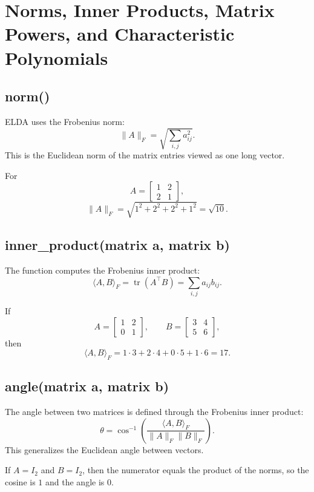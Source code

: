 \documentclass[11pt,a4paper,openany]{book}
\def\code#1{#1}%
\DeclareRobustCommand{\code}[1]{\texttt{\detokenize{#1}}}
\DeclareMathOperator{\tr}{tr}
\begin{document}
\chapter{Norms, Inner Products, Matrix Powers, and Characteristic Polynomials}

\section{\code{norm()}}
ELDA uses the Frobenius norm:
\[
\|A\|_F = \sqrt{\sum_{i,j} a_{ij}^2}.
\]
This is the Euclidean norm of the matrix entries viewed as one long vector.

\begin{examplebox}[Example]
For
\[
A =
\begin{bmatrix}
1 & 2 \\
2 & 1
\end{bmatrix},
\]
\[
\|A\|_F = \sqrt{1^2 + 2^2 + 2^2 + 1^2} = \sqrt{10}.
\]
\end{examplebox}

\section{\code{inner_product(matrix a, matrix b)}}
The function computes the Frobenius inner product:
\[
\langle A, B \rangle_F = \tr(A^\top B) = \sum_{i,j} a_{ij}b_{ij}.
\]

\begin{examplebox}[Example]
If
\[
A =
\begin{bmatrix}
1 & 2 \\
0 & 1
\end{bmatrix},
\qquad
B =
\begin{bmatrix}
3 & 4 \\
5 & 6
\end{bmatrix},
\]
then
\[
\langle A, B \rangle_F = 1\cdot3 + 2\cdot4 + 0\cdot5 + 1\cdot6 = 17.
\]
\end{examplebox}

\section{\code{angle(matrix a, matrix b)}}
The angle between two matrices is defined through the Frobenius inner product:
\[
\theta = \cos^{-1}\left(\frac{\langle A, B \rangle_F}{\|A\|_F \|B\|_F}\right).
\]
This generalizes the Euclidean angle between vectors.

\begin{examplebox}[Example]
If \(A = I_2\) and \(B = I_2\), then the numerator equals the product of the norms, so the cosine is \(1\) and the angle is \(0\).
\end{examplebox}
\end{document}
